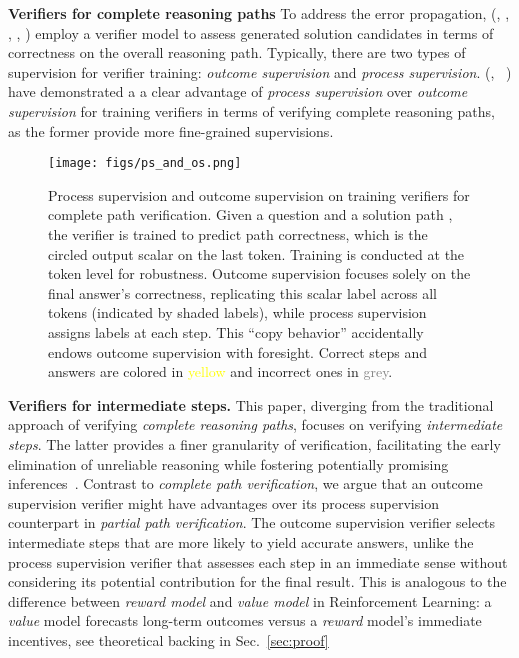 \documentclass[11pt]{article}
\theoremstyle{plain}
\theoremstyle{claim}
\theoremstyle{rethinking}
\theoremstyle{researchquestion}
\theoremstyle{findings}
\theoremstyle{fact}
\theoremstyle{proper}
\theoremstyle{remark}
\begin{document}
\textbf{Verifiers for complete reasoning paths}
To address the   error propagation,  (\citealp{gsm8k21}, \citealp{deepmind-process22}, \citealp{li2023making}, \citealp{khalifa2023guided}, \citealp{openai-process23})   employ a verifier model to assess generated solution candidates  in terms of correctness  on the overall reasoning path. 
Typically, there are two types of supervision for verifier training: \textit{outcome supervision} and \textit{process supervision}. 
(\citealp{deepmind-process22}, ~\citealp{openai-process23}) have demonstrated a a clear advantage  of \textit{process supervision} over   \textit{outcome supervision} for training verifiers in terms of verifying complete reasoning paths, as the former provide more fine-grained supervisions.

\begin{figure*}
    \centering
    \texttt{[image: figs/ps\_and\_os.png]}
    \caption{\label{fig:ps_and_os} Process supervision and outcome supervision on training verifiers for complete path verification. Given a question  and a solution path , the verifier is trained to predict path correctness, which is the circled output scalar on the last token. Training is conducted at the token level for robustness. Outcome supervision focuses solely on the final answer's correctness, replicating this scalar label across all tokens (indicated by shaded labels), while process supervision assigns labels at each step. This ``copy behavior'' accidentally endows outcome supervision with foresight. Correct steps and answers are colored in \textcolor{yellow}{yellow} and incorrect ones in \textcolor{gray}{grey}.}
\end{figure*}


\textbf{Verifiers for intermediate steps. }
This paper, diverging from the traditional approach of verifying \textit{complete reasoning paths}, focuses on verifying \textit{intermediate steps}. The latter  provides a finer granularity of verification, facilitating the early elimination of unreliable reasoning while fostering potentially promising inferences~\cite{tot23}.  
Contrast to  \textit{complete path verification}, we argue that an outcome supervision verifier might have advantages over its process supervision counterpart in \textit{partial path verification}. 
The outcome supervision verifier selects  intermediate steps that are more likely to yield accurate answers, unlike the process supervision verifier that assesses each step  in an immediate sense without considering its potential contribution for the final result.
This is analogous to the difference between \textit{reward model} and \textit{value model} in  Reinforcement Learning: a \textit{value} model forecasts long-term outcomes versus a \textit{reward} model's immediate incentives, see theoretical backing  in Sec.~\ref{sec:proof}
\end{document}
